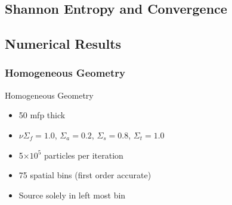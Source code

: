 \documentclass[xcolor={usenames, dvipsnames},]{beamer}
\newcommand{\e}[1]{\ensuremath{\times 10^{#1}}}
\begin{document}
\subsection{Shannon Entropy and Convergence}
\subsection{Numerical Results}
\subsubsection{Homogeneous Geometry}
\begin{frame}{Homogeneous Geometry}
    \begin{itemize}
        \item 50 mfp thick
        \item $\nu\Sigma_f = 1.0$, $\Sigma_a = 0.2$, $\Sigma_s = 0.8$, $\Sigma_t = 1.0$
        \item 5\e{5} particles per iteration
        \item 75 spatial bins (first order accurate)
        \item Source solely in left most bin
    \end{itemize}
\end{frame}
\end{document}
